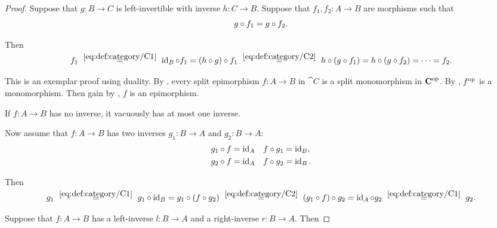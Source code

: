 \begin{proof}
   Suppose that \( g: B \to C \) is left-invertible with inverse \( h: C \to B \). Suppose that \( f_1, f_2: A \to B \) are morphisms such that
  \begin{equation*}
    g \bincirc f_1 = g \bincirc f_2.
  \end{equation*}

  Then
  \begin{equation*}
    f_1
    \reloset {\eqref{eq:def:category/C1}} =
    \id_B \bincirc f_1
    =
    (h \bincirc g) \bincirc f_1
    \reloset {\eqref{eq:def:category/C2}} =
    h \bincirc (g \bincirc f_1)
    =
    h \bincirc (g \bincirc f_2)
    =
    \cdots
    =
    f_2.
  \end{equation*}

   This is an exemplar proof using duality. By , every split epimorphism \( f: A \to B \) in \( \cat{C} \) is a split monomorphism in \( \operatorname{\mathbf{C}}^{\operatorname{op}} \). By , \( f^{\operatorname{op}} \) is a monomorphism. Then gain by , \( f \) is an epimorphism.

   If \( f: A \to B \) has no inverse, it vacuously has at most one inverse.

  Now assume that \( f: A \to B \) has two inverses \( g_1: B \to A \) and \( g_2: B \to A \):
  \begin{align*}
    g_1 \bincirc f = \id_A &&& f \bincirc g_1 = \id_B, \\
    g_2 \bincirc f = \id_A &&& f \bincirc g_2 = \id_B.
  \end{align*}

  Then
  \begin{equation*}
    g_1
    \reloset {\eqref{eq:def:category/C1}} =
    g_1 \bincirc \id_B
    =
    g_1 \bincirc (f \bincirc g_2)
    \reloset {\eqref{eq:def:category/C2}} =
    (g_1 \bincirc f) \bincirc g_2
    =
    \id_A \bincirc g_2
    \reloset {\eqref{eq:def:category/C1}} =
    g_2.
  \end{equation*}

   Suppose that \( f: A \to B \) has a left-inverse \( l: B \to A \) and a right-inverse \( r: B \to A \). Then


\end{proof}
